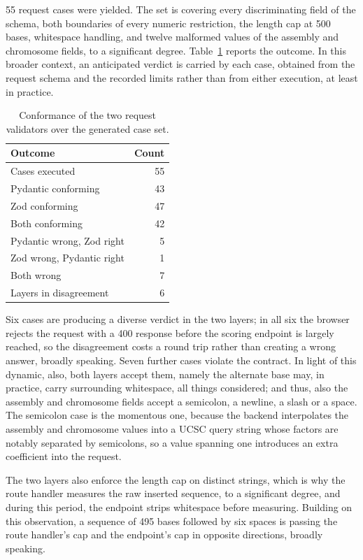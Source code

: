 \documentclass[10pt,journal]{IEEEtran}
\begin{document}
55 request cases were yielded. The set is covering every discriminating field of the schema, both boundaries of every numeric restriction, the length cap at 500 bases, whitespace handling, and twelve malformed values of the assembly and chromosome fields, to a significant degree. Table~\ref{tab:validation} reports the outcome. In this broader context, an anticipated verdict is carried by each case, obtained from the request schema and the recorded limits rather than from either execution, at least in practice.

\begin{table}[!t]
\caption{Conformance of the two request validators over the generated case set.}
\label{tab:validation}
\centering
\footnotesize
\begin{tabular}{@{}lr@{}}
\toprule
Outcome & Count \\
\midrule
Cases executed & 55 \\
Pydantic conforming & 43 \\
Zod conforming & 47 \\
Both conforming & 42 \\
Pydantic wrong, Zod right & 5 \\
Zod wrong, Pydantic right & 1 \\
Both wrong & 7 \\
\midrule
Layers in disagreement & 6 \\
\bottomrule
\end{tabular}
\end{table}

Six cases are producing a diverse verdict in the two layers; in all six the browser rejects the request with a 400 response before the scoring endpoint is largely reached, so the disagreement costs a round trip rather than creating a wrong answer, broadly speaking. Seven further cases violate the contract. In light of this dynamic, also, both layers accept them, namely the alternate base may, in practice, carry surrounding whitespace, all things considered; and thus, also the assembly and chromosome fields accept a semicolon, a newline, a slash or a space. The semicolon case is the momentous one, because the backend interpolates the assembly and chromosome values into a UCSC query string whose factors are notably separated by semicolons, so a value spanning one introduces an extra coefficient into the request.

The two layers also enforce the length cap on distinct strings, which is why the route handler measures the raw inserted sequence, to a significant degree, and during this period, the endpoint strips whitespace before measuring. Building on this observation, a sequence of 495 bases followed by six spaces is passing the route handler's cap and the endpoint's cap in opposite directions, broadly speaking.
\end{document}
